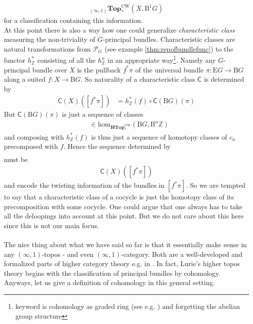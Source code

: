 \begin{align*}
  {}_{(\infty,1)}\mathbf{Top}_{\ast}^{\textrm{CW}}
  \left(
    X,
    \mathrm{B}^{1}G
  \right)
\end{align*}
for a classification containing this information.
\\
At this point there is also a way how one could generalize \textit{characteristic class} measuring the non-triviality of $G$-principal bundles. Characteristic classes are natural transformations from $\mathcal{P}_{G}$ (see example \ref{thm:repofbundlefunc}) to the functor $h_{\mathbb{Z}}^{\ast}$ consisting of all the $h_{\mathbb{Z}}^{n}$ in an appropriate way\footnote{keyword is cohomology as graded ring (see e.g. \cite{8b5861fc}) and forgetting the abelian group structure}. Namely any $G$-principal bundle over $X$ is the pullback $f^{\ast}\pi$ of the universal bundle $\pi \colon \mathrm{E}G \rightarrow \mathrm{B}G$ along a suited $f \colon X \rightarrow \mathrm{B}G$. So naturality of a characteristic class $\mathsf{C}$ is determined by
\begin{align*}
  \mathsf{C}(X)
  \left(
    [f^{\ast}\pi]
  \right)
  &=
  h_{\mathbb{Z}}^{\ast}(f)
  \circ
  \mathsf{C}(\mathrm{B}G)(\pi)
\end{align*}
But $\mathsf{C}(\mathrm{B}G)(\pi)$ is just a sequence of classes
\begin{align*}
  [c_{n}]
  &\in
  \mathrm{hom}_{\mathbf{HTop}_{\ast}^{\textrm{CW}}}
  \left(
    \mathrm{B}G,
    \mathrm{B}^{n}\mathbb{Z}
  \right)
\end{align*}
and composing with $h_{\mathbb{Z}}^{\ast}(f)$ is thus just a sequence of homotopy classes of $c_{n}$ precomposed with $f$. Hence the sequence determined by
\begin{align*}
  [c_{n} \circ f]
\end{align*}
must be
\begin{align*}
  \mathsf{C}(X)
  \left(
    [f^{\ast}\pi]
  \right)
\end{align*}
and encode the twisting information of the bundles in  $[f^{\ast}\pi]$. So we are tempted to say that a characteristic class of a cocycle is just the homotopy class of its precomposition with some cocycle. One could argue that one always has to take all the deloopings into account at this point. But we do not care about this here since this is not our main focus.
\\\\
The nice thing about what we have said so far is that it essentially make sense 
in any $(\infty,1)$-topos - and even $(\infty,1)$-category. Both are a well-developed and formalized parts of higher category theory e.g. in \cite{0349e8ea}. In fact, Lurie's higher topos theory \cite{0349e8ea} begins with the classification of principal bundles by cohomology. Anyways, let us give a definition of cohomology in this general setting.
